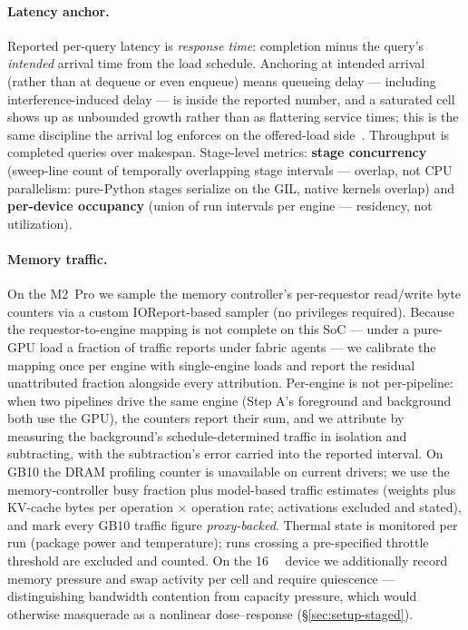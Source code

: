 \paragraph{Latency anchor.} Reported per-query latency is \emph{response
time}: completion minus the query's \emph{intended} arrival time from the
load schedule. Anchoring at intended arrival (rather than at dequeue or even
enqueue) means queueing delay --- including interference-induced delay ---
is inside the reported number, and a saturated cell shows up as unbounded
growth rather than as flattering service times; this is the same discipline
the arrival log enforces on the offered-load
side~\cite{tene2015coordinated}. Throughput is completed queries over
makespan. Stage-level metrics: \textbf{stage concurrency} (sweep-line count
of temporally overlapping stage intervals --- overlap, not CPU parallelism:
pure-Python stages serialize on the GIL, native kernels overlap) and
\textbf{per-device occupancy} (union of run intervals per engine ---
residency, not utilization).

\paragraph{Memory traffic.} On the M2~Pro we sample the memory controller's
per-requestor read/write byte counters via a custom IOReport-based sampler
(no privileges required). Because the requestor-to-engine mapping is not
complete on this SoC --- under a pure-GPU load a fraction of traffic reports
under fabric agents --- we calibrate the mapping once per engine with
single-engine loads and report the residual unattributed fraction alongside
every attribution. Per-engine is not per-pipeline: when two pipelines drive
the same engine (Step A's foreground and background both use the GPU), the
counters report their sum, and we attribute by measuring the background's
schedule-determined traffic in isolation and subtracting, with the
subtraction's error carried into the reported interval. On GB10 the DRAM profiling counter is unavailable on
current drivers; we use the memory-controller busy fraction plus
model-based traffic estimates (weights plus KV-cache bytes per operation
$\times$ operation rate; activations excluded and stated), and mark every
GB10 traffic figure \emph{proxy-backed}. Thermal state is
monitored per run (package power and temperature); runs crossing a
pre-specified throttle threshold are excluded and counted. On the
\SI{16}{\giga\byte} device we additionally record memory pressure and swap
activity per cell and require quiescence --- distinguishing bandwidth
contention from capacity pressure, which would otherwise masquerade as a
nonlinear dose--response (\S\ref{sec:setup-staged}).

